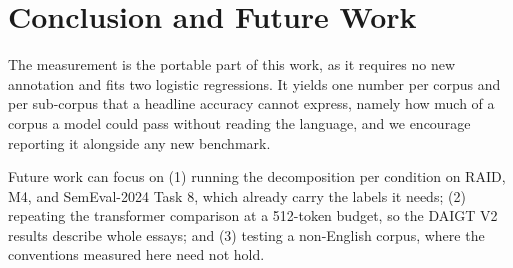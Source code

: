 \documentclass[conference,a4paper]{IEEEtran}
\begin{document}
\section{Conclusion and Future Work}
\label{sec:conclusion}

The measurement is the portable part of this work, as it requires no new annotation and fits two logistic regressions. It yields one number per corpus and per sub-corpus that a headline accuracy cannot express, namely how much of a corpus a model could pass without reading the language, and we encourage reporting it alongside any new benchmark.

Future work can focus on (1) running the decomposition per condition on RAID, M4, and SemEval-2024 Task 8, which already carry the labels it needs; (2) repeating the transformer comparison at a 512-token budget, so the DAIGT V2 results describe whole essays; and (3) testing a non-English corpus, where the conventions measured here need not hold.



\balance


\end{document}
